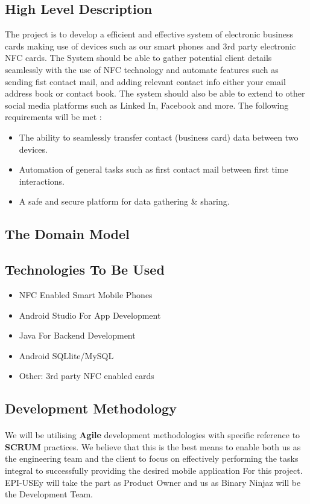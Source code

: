 \documentclass[11pt]{article}
\begin{document}
\subsection{High Level Description}
The project is to develop a efficient and effective system of electronic business cards making use of devices such as our smart phones and 3rd party electronic NFC cards. The System should be able to gather potential client details seamlessly with the use of NFC technology and automate features such as sending fist contact mail, and adding relevant contact info either your email address book or contact book. The system should also be able to extend to other social media platforms such as Linked In, Facebook and more.
\newline
\newline The following requirements will be met : 
\begin{itemize}
\item The ability to seamlessly transfer contact (business card) data  between two devices.
\item Automation of general tasks such as first contact mail between first time interactions.
\item A safe and secure platform for data gathering & sharing.
\end{itemize}

\subsection{The Domain Model}

\subsection{Technologies To Be Used}
\begin{itemize}
\item NFC Enabled Smart Mobile Phones
\item Android Studio For App Development
\item Java For Backend Development
\item Android SQLlite/MySQL
\item Other: 3rd party NFC enabled cards 
\end{itemize}
\subsection{Development Methodology}
\paragraph{} We will be utilising \textbf{Agile} development methodologies with specific reference to \textbf{SCRUM} practices. We believe that this is the best means to enable both us as the engineering team and the client to focus on effectively performing the tasks integral to successfully providing the desired mobile application For this project. EPI-USEy will take the part as Product Owner and us as Binary Ninjaz will be the Development Team. 
\end{document}
